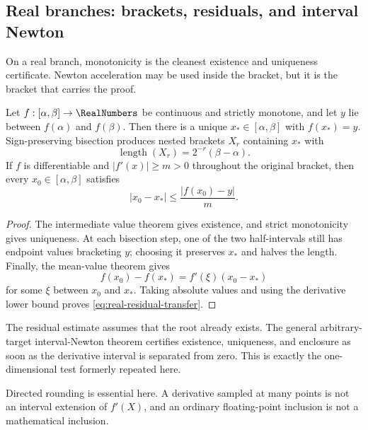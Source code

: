 \subsection{Real branches: brackets, residuals, and interval Newton}
\label{sec:real-branch-certification}

On a real branch, monotonicity is the cleanest existence and uniqueness
certificate.  Newton acceleration may be used inside the bracket, but it is
the bracket that carries the proof.

\begin{theorem}
\label{thm:monotone-branch-certificate}
Let \(f:[\alpha,\beta]\to\RealNumbers\) be continuous and strictly monotone, and let
\(y\) lie between \(f(\alpha)\) and \(f(\beta)\).  Then there is a unique
\(x_*\in[\alpha,\beta]\) with \(f(x_*)=y\).  Sign-preserving bisection produces
nested brackets \(X_r\) containing \(x_*\) with
\[
 \operatorname{length}(X_r)=2^{-r}(\beta-\alpha).
\]
If \(f\) is differentiable and
\(\lvert f'(x)\rvert\ge m>0\) throughout the original bracket, then every
\(x_0\in[\alpha,\beta]\) satisfies
\begin{equation}
 \lvert x_0-x_*\rvert\le
 \frac{\lvert f(x_0)-y\rvert}{m}.
 \label{eq:real-residual-transfer}
\end{equation}
\end{theorem}

\begin{proof}
The intermediate value theorem gives existence, and strict monotonicity gives
uniqueness.  At each bisection step, one of the two half-intervals still has
endpoint values bracketing \(y\); choosing it preserves \(x_*\) and halves the
length.  Finally, the mean-value theorem gives
\[
 f(x_0)-f(x_*)=f'(\xi)(x_0-x_*)
\]
for some \(\xi\) between \(x_0\) and \(x_*\).  Taking absolute values and using
the derivative lower bound proves \eqref{eq:real-residual-transfer}.
\end{proof}

The residual estimate assumes that the root already exists.  The general
arbitrary-target interval-Newton theorem
 certifies existence, uniqueness,
and enclosure as soon as the derivative interval is separated from zero.
This is exactly the one-dimensional test formerly repeated here.

Directed rounding is essential here.  A derivative sampled at many points is
not an interval extension of \(f'(X)\), and an ordinary floating-point
inclusion is not a mathematical inclusion.

